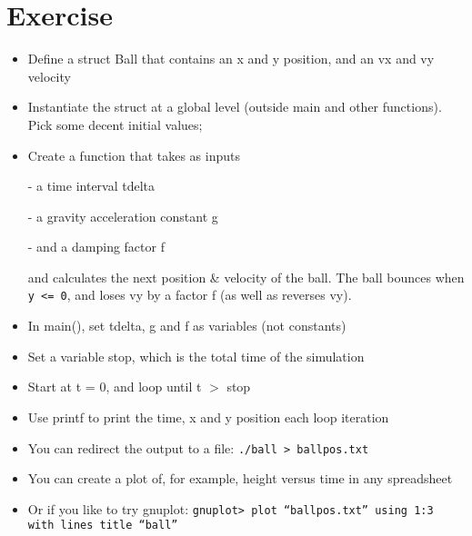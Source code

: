 \documentclass[a4paper]{article}
\begin{document}
\section{Exercise}

\begin{itemize}

\item Define a struct Ball that contains an x and y position, and an vx and vy velocity

  \item Instantiate the struct at a global level (outside main and other functions). Pick some decent initial values;

    \item Create a function that takes as inputs

      - a time interval tdelta

      - a gravity acceleration constant g

      - and a damping factor f
      
      and calculates the next position \& velocity of the ball. The ball bounces when \lstinline|y <= 0|, and loses vy by a factor f (as well as reverses vy).

\end{itemize}

\begin{itemize}

\item In main(), set tdelta, g and f as variables (not constants)

\item Set a variable stop, which is the total time of the simulation

\item Start at t = 0, and loop until t $>$ stop
        
\item Use printf to print the time, x and y position each loop iteration
  
\end{itemize}

\begin{itemize}

\item You can redirect the output to a file: \lstinline|./ball > ballpos.txt|
  
\item You can create a plot of, for example, height versus time in any spreadsheet

\item Or if you like to try gnuplot: \lstinline|gnuplot> plot “ballpos.txt” using 1:3 with lines title “ball”|
  
\end{itemize}
\end{document}
